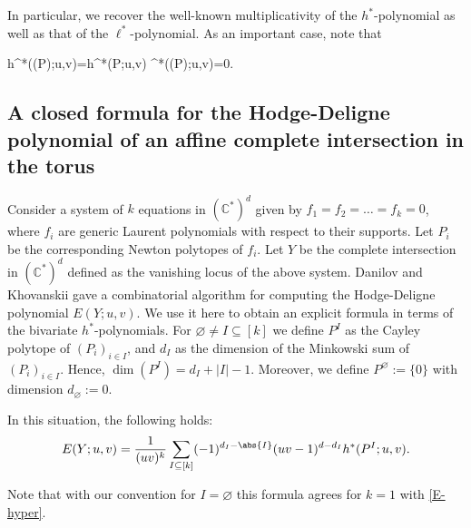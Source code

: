 \documentclass[reqno, 11pt, a4paper, oneside]{amsart}
\begin{document}
In particular, we recover the well-known multiplicativity of the $h^*$-polynomial \cite[Lemma~1.3]{henk_lower_2009} as well as that of the $\ell^*$-polynomial. As an important case, note that 

\be h^*(\pyr(P);u,v)=h^*(P;u,v)  \ell^*(\pyr(P);u,v)=0. \label{invformula} \ee

 \subsection{A closed formula for the Hodge-Deligne polynomial of an affine complete intersection in the torus}
 
  Consider a system of $k$ equations in $(\mathbb{C}^*)^d$ given by $f_1 = f_2 = \ldots = f_{k} =0$, where $f_i$  are generic Laurent polynomials with respect to their supports. Let $P_i$ be the corresponding Newton polytopes of $f_i$. Let $Y$ be the complete intersection in $(\mathbb{C}^*)^d$ defined as the vanishing locus of the above system. Danilov and Khovanskii \cite{danilov_newton_1987} gave a combinatorial algorithm for computing the Hodge-Deligne polynomial $E(Y;u,v)$. We use it here to obtain an explicit formula in terms of the bivariate $h^*$-polynomials.    For $\varnothing \not= I \subseteq [k]$ we define $P^I$ as the Cayley polytope of $(P_i)_{i \in I}$, and $d_I$ as the dimension of the Minkowski sum of $(P_i)_{i \in I}$. Hence, $\dim(P^I) = d_I+|I|-1$. Moreover, we define $P^{\varnothing} := \{0\}$ with dimension $d_\varnothing := 0$.

 \begin{prop} \label{prop: mixed_h_relation} In this situation, the following holds:
   \[ E (Y; u,v) =\frac{1}{(uv)^k} \sum_{I \subseteq[k]} (-1)^{d_I -\abs{I}} (uv-1)^{d-d_I} h^*(P^I; u,v).\]  
\end{prop}

Note that with our convention for $I=\varnothing$ this formula agrees for $k=1$ with \eqref{E-hyper}. 
\end{document}
